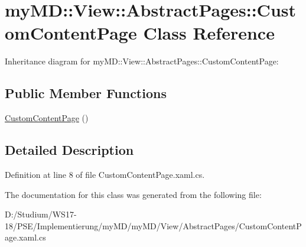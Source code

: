 \hypertarget{classmy_m_d_1_1_view_1_1_abstract_pages_1_1_custom_content_page}{
\section{my\-MD::View::Abstract\-Pages::Custom\-Content\-Page Class Reference}
\label{dc/d8b/classmy_m_d_1_1_view_1_1_abstract_pages_1_1_custom_content_page}
}
Inheritance diagram for my\-MD::View::Abstract\-Pages::Custom\-Content\-Page:\subsection*{Public Member Functions}
\begin{CompactItemize}
\item 
\hypertarget{classmy_m_d_1_1_view_1_1_abstract_pages_1_1_custom_content_page_4e2cdc7f2358d71e16cd03ce3e8bf310}{
\hyperlink{classmy_m_d_1_1_view_1_1_abstract_pages_1_1_custom_content_page_4e2cdc7f2358d71e16cd03ce3e8bf310}{Custom\-Content\-Page} ()}
\label{dc/d8b/classmy_m_d_1_1_view_1_1_abstract_pages_1_1_custom_content_page_4e2cdc7f2358d71e16cd03ce3e8bf310}

\end{CompactItemize}


\subsection{Detailed Description}




Definition at line 8 of file Custom\-Content\-Page.xaml.cs.

The documentation for this class was generated from the following file:\begin{CompactItemize}
\item 
D:/Studium/WS17-18/PSE/Implementierung/my\-MD/my\-MD/View/Abstract\-Pages/Custom\-Content\-Page.xaml.cs\end{CompactItemize}
